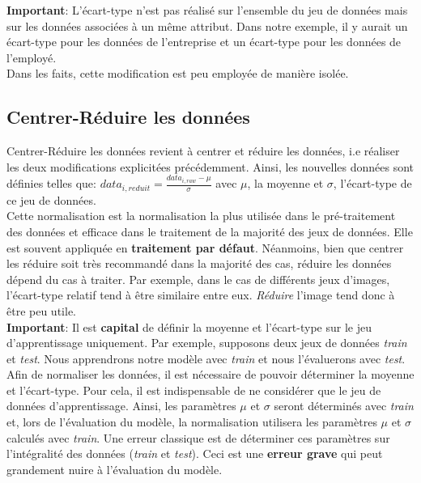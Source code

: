 \noindent \textbf{Important}: L'écart-type n'est pas réalisé sur l'ensemble du jeu de données mais sur les données associées à un même attribut. Dans notre exemple, il y aurait un écart-type pour les données de l'entreprise et un écart-type pour les données de l'employé.\\

\noindent Dans les faits, cette modification est peu employée de manière isolée.

\subsection{Centrer-Réduire les données}
Centrer-Réduire les données revient à centrer et réduire les données, i.e réaliser les deux modifications explicitées précédemment. Ainsi, les nouvelles données sont définies telles que: $data_{i,reduit}=\frac{data_{i,raw}-\mu}{\sigma}$ avec $\mu$, la moyenne et $\sigma$, l'écart-type de ce jeu de données.\\

\noindent Cette normalisation est la normalisation la plus utilisée dans le pré-traitement des données et efficace dans le traitement de la majorité des jeux de données. Elle est souvent appliquée en \textbf{traitement par défaut}. Néanmoins, bien que centrer les réduire soit très recommandé dans la majorité des cas, réduire les données dépend du cas à traiter. Par exemple, dans le cas de différents jeux d'images, l'écart-type relatif tend à être similaire entre eux. \textit{Réduire} l'image tend donc à être peu utile.\\

\noindent \textbf{Important}: Il est \textbf{capital} de définir la moyenne et l'écart-type sur le jeu d'apprentissage uniquement. Par exemple, supposons deux jeux de données \textit{train} et  \textit{test}. Nous apprendrons notre modèle avec \textit{train} et nous l'évaluerons avec \textit{test}. Afin de normaliser les données, il est nécessaire de pouvoir déterminer la moyenne et l'écart-type. Pour cela, il est indispensable de ne considérer que le jeu de données d'apprentissage. Ainsi, les paramètres $\mu$ et $\sigma$ seront déterminés avec \textit{train} et, lors de l'évaluation du modèle, la normalisation utilisera les paramètres $\mu$ et $\sigma$ calculés avec \textit{train}. Une erreur classique est de déterminer ces paramètres sur l'intégralité des données (\textit{train} et \textit{test}). Ceci est une \textbf{erreur grave} qui peut grandement nuire à l'évaluation du modèle.

